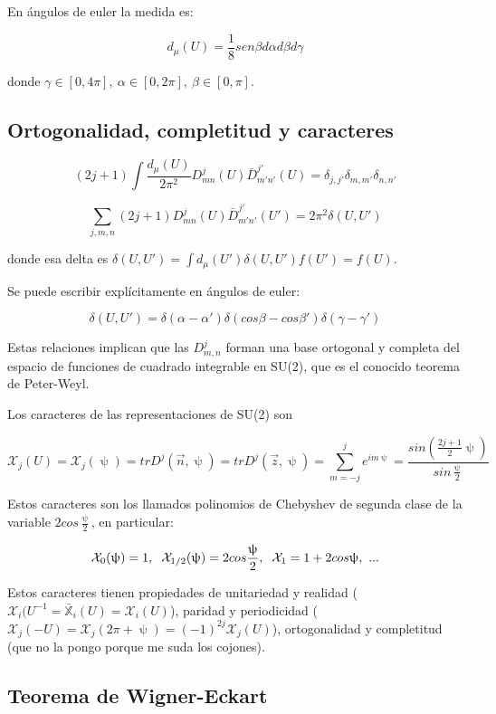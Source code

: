 \smallskip
En ángulos de euler la medida es:

$$d_\mu (U)=\frac{1}{8}sen \beta d\alpha d\beta d\gamma$$

donde $\gamma \in [0,4\pi], \ \alpha \in [0,2\pi], \ \beta \in [0,\pi]$.

\subsection{Ortogonalidad, completitud y caracteres}

$$(2j+1)\int \frac{d_\mu (U)}{2\pi^2} D^j_{mn}(U)\bar{D}_{m'n'}^{j'}(U)=\delta _{j,j'}\delta _{m,m'}\delta _{n,n'}$$

$$\sum _{j,m,n} (2j+1)D^j_{mn}(U)\bar{D}_{m'n'}^{j'}(U')=2\pi ^2 \delta (U,U')$$

donde esa delta es $\delta (U,U')=\int d_\mu (U')\delta (U,U') f(U') =f(U)$.

Se puede escribir explícitamente en ángulos de euler:

$$\delta (U,U')=\delta (\alpha - \alpha ')\delta (cos \beta - cos \beta ')\delta (\gamma - \gamma ')$$


Estas relaciones implican que las $D_{m,n}^j$ forman una base ortogonal y completa del espacio de funciones de cuadrado integrable en SU(2), que es el conocido teorema de Peter-Weyl.

\smallskip
Los caracteres de las representaciones de SU(2) son

$$\mathcal{X}_j(U)=\mathcal{X}_j(\uppsi)=trD^j(\Vec{n},\uppsi)=trD^j(\Vec{z},\uppsi)=\sum _{m=-j}^j e^{im\uppsi}=\frac{sin (\frac{2j+1}{2}\uppsi)}{sin \frac{\uppsi}{2}}$$

Estos caracteres son los llamados polinomios de Chebyshev de segunda clase de la variable $2cos\frac{\uppsi}{2}$, en particular:

$$\mathcal{X}_0(\uppsi)=1, \hspace{0.2cm} \mathcal{X}_{1/2}(\uppsi)=2cos \frac{\uppsi}{2}, \hspace{0.2cm} \mathcal{X}_1=1+2cos\uppsi , \ ...$$

Estos caracteres tienen propiedades de unitariedad y realidad ($\mathcal{X}_i(U^{-1}=\bar{\mathds{X}}_i(U)=\mathcal{X}_i(U)$), paridad y periodicidad ($\mathcal{X}_j(-U)=\mathcal{X}_j(2\pi + \uppsi) =(-1)^{2j}\mathcal{X}_j(U)$), ortogonalidad y completitud (que no la pongo porque me suda los cojones).

\subsection{Teorema de Wigner-Eckart}

